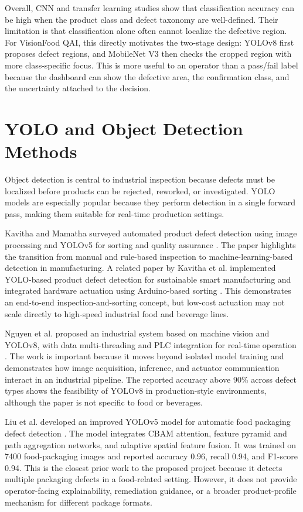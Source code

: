 \documentclass[12pt,a4paper]{report}
\newcommand{\shorttitle}{VisionFood QAI}
\begin{document}
Overall, CNN and transfer learning studies show that classification accuracy can be high when the product class and defect taxonomy are well-defined. Their limitation is that classification alone often cannot localize the defective region. For \shorttitle, this directly motivates the two-stage design: YOLOv8 first proposes defect regions, and MobileNet V3 then checks the cropped region with more class-specific focus. This is more useful to an operator than a pass/fail label because the dashboard can show the defective area, the confirmation class, and the uncertainty attached to the decision.

\section{YOLO and Object Detection Methods}
\label{sec:yolo-detection}

Object detection is central to industrial inspection because defects must be localized before products can be rejected, reworked, or investigated. YOLO models are especially popular because they perform detection in a single forward pass, making them suitable for real-time production settings.

Kavitha and Mamatha surveyed automated product defect detection using image processing and YOLOv5 for sorting and quality assurance \cite{kavitha2024automated}. The paper highlights the transition from manual and rule-based inspection to machine-learning-based detection in manufacturing. A related paper by Kavitha et al. implemented YOLO-based product defect detection for sustainable smart manufacturing and integrated hardware actuation using Arduino-based sorting \cite{kavitha2024deeplearning}. This demonstrates an end-to-end inspection-and-sorting concept, but low-cost actuation may not scale directly to high-speed industrial food and beverage lines.

Nguyen et al. proposed an industrial system based on machine vision and YOLOv8, with data multi-threading and PLC integration for real-time operation \cite{nguyen2025industrial}. The work is important because it moves beyond isolated model training and demonstrates how image acquisition, inference, and actuator communication interact in an industrial pipeline. The reported accuracy above 90\% across defect types shows the feasibility of YOLOv8 in production-style environments, although the paper is not specific to food or beverages.

Liu et al. developed an improved YOLOv5 model for automatic food packaging defect detection \cite{liu2025foodpkg}. The model integrates CBAM attention, feature pyramid and path aggregation networks, and adaptive spatial feature fusion. It was trained on 7400 food-packaging images and reported accuracy 0.96, recall 0.94, and F1-score 0.94. This is the closest prior work to the proposed project because it detects multiple packaging defects in a food-related setting. However, it does not provide operator-facing explainability, remediation guidance, or a broader product-profile mechanism for different package formats.
\end{document}
